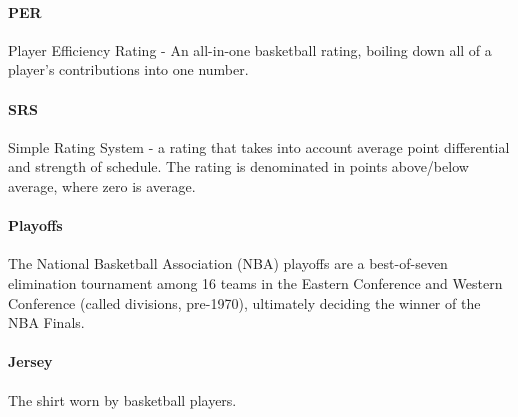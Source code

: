 \documentclass[]{sigchi}
\begin{document}
\paragraph{PER} Player Efficiency Rating - An all-in-one basketball rating,
boiling down all of a player's contributions into one number\cite{per}.

\paragraph{SRS} Simple Rating System - a rating that takes into account average
point differential and strength of schedule. The rating is denominated in points
above/below average, where zero is average\cite{srs}. 

\paragraph{Playoffs} The National Basketball Association (NBA) playoffs are a
best-of-seven elimination tournament among 16 teams in the Eastern Conference
and Western Conference (called divisions, pre-1970), ultimately deciding the
winner of the NBA Finals\cite{playoffs}.

\paragraph{Jersey} The shirt worn by basketball players.
\end{document}
